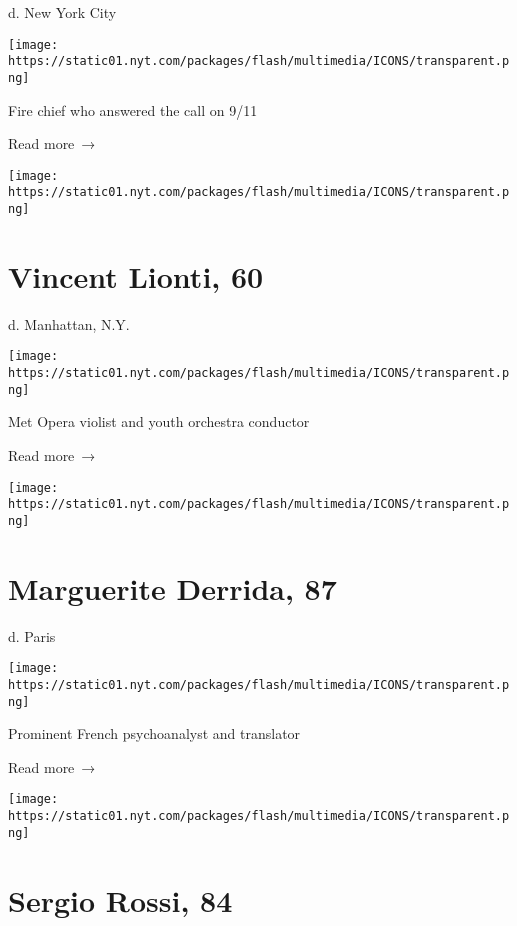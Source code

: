 d. New York City

\texttt{[image: https://static01.nyt.com/packages/flash/multimedia/ICONS/transparent.png]}

Fire chief who answered the call on 9/11

 Read more~→

\href{https://www.nytimes.com/2020/04/06/obituaries/vincent-lionti-dead-coronavirus.html}{}

\texttt{[image: https://static01.nyt.com/packages/flash/multimedia/ICONS/transparent.png]}

\hypertarget{vincent-lionti-60}{%
\section{Vincent Lionti, 60}\label{vincent-lionti-60}}

d. Manhattan, N.Y.

\texttt{[image: https://static01.nyt.com/packages/flash/multimedia/ICONS/transparent.png]}

Met Opera violist and youth orchestra conductor

 Read more~→

\href{https://www.nytimes.com/2020/04/06/obituaries/marguerite-derrida-dead-coronavirus.html}{}

\texttt{[image: https://static01.nyt.com/packages/flash/multimedia/ICONS/transparent.png]}

\hypertarget{marguerite-derrida-87}{%
\section{Marguerite Derrida, 87}\label{marguerite-derrida-87}}

d. Paris

\texttt{[image: https://static01.nyt.com/packages/flash/multimedia/ICONS/transparent.png]}

Prominent French psychoanalyst and translator

 Read more~→

\href{https://www.nytimes.com/2020/04/06/obituaries/sergio-rossi-dead-coronavirus.html}{}

\texttt{[image: https://static01.nyt.com/packages/flash/multimedia/ICONS/transparent.png]}

\hypertarget{sergio-rossi-84}{%
\section{Sergio Rossi, 84}\label{sergio-rossi-84}}

